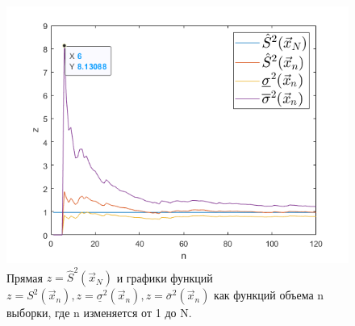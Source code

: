 \documentclass[a4paper,oneside,12pt]{extreport}
\theoremstyle{indented}
\begin{document}
\begin{enumerate}
\begin{figure}[H]
\begin{center}
\includegraphics[scale=1]{inc/img/outputGraph4.png}
\captionsetup{justification=centering}
	\caption{Прямая $z=\hat S^2 (\vec x_N)$ и графики функций $z= S^2 (\vec x_n), z= \underline \sigma^2 (\vec x_n), z =\overline \sigma^2 (\vec x_n)$ как функций объема n выборки, где n изменяется от 1 до N.}
	\label{img:outputGraph4}	
\end{center}
\end{figure}

\end{enumerate}
\end{document}
